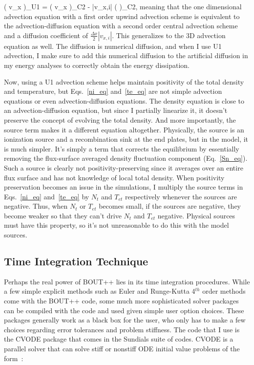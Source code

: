 \beq
\label{u1_symb}
\left( v_x  \right)_{U1} = \left( v_x  \right)_{C2} -  |v_{x,i}| \left(  \right)_{C2},
\eeq
meaning that the one dimensional advection equation with a first order upwind advection scheme is equivalent to the advection-diffusion equation with a second order central advection scheme 
and a diffusion coefficient of $\frac{\Delta x}{2} |v_{x,i}|$. This generalizes to the 3D advection equation as well. The diffusion is numerical diffusion, and when I use U1 advection, I make
sure to add this numerical diffusion to the artificial diffusion in my energy analyses to correctly obtain the energy dissipation.

Now, using a U1 advection scheme helps maintain positivity of the total density and temperature, but Eqs.~\ref{ni_eq} and~\ref{te_eq} are not simple advection equations or even advection-diffusion
equations. The density equation is close to an advection-diffusion equation, but since I partially linearize it, it doesn't preserve the concept of evolving the total density. And more
importantly, the source term makes it a different equation altogether. Physically, the source is an ionization source and a recombination sink at the end plates, but in the model, it is much
simpler. It's simply a term that corrects the equilibrium by essentially removing the flux-surface averaged density fluctuation component (Eq.~\ref{Sn_eq}). 
Such a source is clearly not positivity-preserving since it averages over an entire flux surface and has not knowledge of local total density. When positivity preservation becomes an issue
in the simulations, I multiply the source terms in Eqs.~\ref{ni_eq} and~\ref{te_eq} by $N_{t}$ and $T_{et}$ respectively whenever the sources are negative. Thus, when $N_{t}$ or $T_{et}$
becomes small, if the sources are negative, they become weaker so that they can't drive $N_{t}$ and $T_{et}$ negative. Physical sources must have this property, so it's not unreasonable
to do this with the model sources.

\subsection{Time Integration Technique}
\label{ss_time_int}

Perhaps the real power of BOUT++ lies in its time integration procedures. While a few simple explicit methods such as Euler and Runge-Kutta 4$^{th}$ order methods come with the BOUT++ code, some
much more sophisticated solver packages can be compiled with the code and used given simple user option choices. These packages generally work as a black box for the user, who only has to make a few
choices regarding error tolerances and problem stiffness. The code that I use is the CVODE package that comes in the Sundials suite of codes. CVODE is a parallel solver that
can solve stiff or nonstiff ODE initial value problems of the form~\cite{cvode}:

